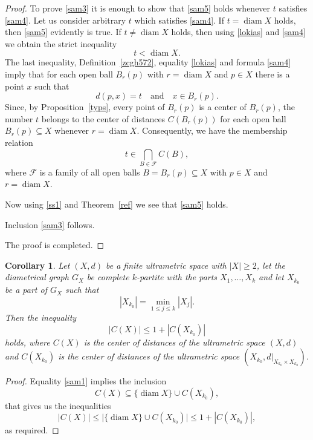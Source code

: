 \documentclass[pdflatex,sn-mathphys-num]{sn-jnl}%
\theoremstyle{thmstyleone}%
\newtheorem{Corollary}[Theorem]{Corollary}
\theoremstyle{thmstyletwo}%
\theoremstyle{thmstylethree}%
\theoremstyle{thmstyletwo}%
\theoremstyle{thmstylethree}%
\begin{document}
\begin{proof}
To prove \eqref{sam3} it is enough to
show that \eqref{sam5} holds whenever $t$ satisfies \eqref{sam4}.
Let us consider arbitrary $t$ which satisfies \eqref{sam4}. If $t=\operatorname{diam} X$ holds, then \eqref{sam5} evidently is true. If $t\ne \operatorname{diam} X$ holds, then using \eqref{lokias} and \eqref{sam4} we obtain the strict inequality 
\begin{equation*}
    t<\operatorname{diam} X.
\end{equation*}
The last inequality, Definition~\ref{zcgh572}, equality \eqref{lokias} and formula \eqref{sam4} imply that for each open ball $B_r(p)$ with $r=\operatorname{diam} X$ and $p\in X$ there is a point $x$ such that
\begin{equation*}
    d(p,x)=t \quad \text{and} \quad x\in B_r(p).
\end{equation*}
Since, by Proposition~\ref{typs}, every point of $B_r(p)$ is a center of $B_r(p)$, the number $t$ belongs to the center of distances $C(B_r(p))$ for each open ball $B_r(p)\subseteq X$ whenever $r=\operatorname{diam} X$.
Consequently, we have the membership relation
\begin{equation}
    \label{ss1}
t \in \bigcap_{B\in \mathcal{F}} C(B),
\end{equation}
where $\mathcal{F}$ is a family  of all open balls $B=B_r(p)\subseteq X$ with $p\in X$ and $r=\operatorname{diam} X$.

Now using \eqref{ss1} and Theorem~\ref{ref} we see that \eqref{sam5} holds. 

Inclusion \eqref{sam3} follows.

The proof is completed.
\end{proof}





\begin{Corollary} \label{kvcr}
Let $(X,d)$ be a finite ultrametric space with $|X|\geq 2$, let the diametrical graph $G_X$ be complete $k$-partite with the parts $X_1,\ldots,X_k$
and let $X_{k_0}$ be a part of $G_X$ such that
\[
|X_{k_0}|=\min\limits_{1\leq j\leq k}|X_j|.
\]
Then the inequality
\[
|C(X)| \leq 1+|C(X_{k_0})|
\]
holds, where $C(X)$ is the center of distances of the ultrametric space $(X,d)$ and 
$C(X_{k_0})$ is the center of distances of the ultrametric space 
$(X_{k_0}, d|_{X_{k_0}\times X_{k_0}})$.
\end{Corollary}

\begin{proof}
Equality \eqref{sam1} implies the inclusion
\begin{equation*}
C(X)\subseteq \{\operatorname{diam}X\}\cup C(X_{k_0}),
\end{equation*}
that gives us the inequalities
\[
|C(X)|
\leq \bigl|\{\operatorname{diam}X\}\cup C(X_{k_0})\bigr|
\leq 1+|C(X_{k_0})|,
\]
as required. 
\end{proof}
\end{document}
